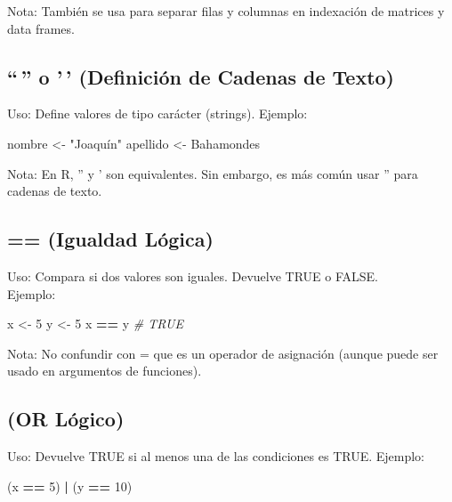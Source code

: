 \documentclass[
]{book}
\newenvironment{Shaded}{\begin{snugshade}}{\end{snugshade}}
\newcommand{\CommentTok}[1]{\textcolor[rgb]{0.56,0.35,0.01}{\textit{#1}}}
\newcommand{\DecValTok}[1]{\textcolor[rgb]{0.00,0.00,0.81}{#1}}
\newcommand{\NormalTok}[1]{#1}
\newcommand{\OtherTok}[1]{\textcolor[rgb]{0.56,0.35,0.01}{#1}}
\newcommand{\SpecialCharTok}[1]{\textcolor[rgb]{0.81,0.36,0.00}{\textbf{#1}}}
\newcommand{\StringTok}[1]{\textcolor[rgb]{0.31,0.60,0.02}{#1}}
\begin{document}
Nota: También se usa para separar filas y columnas en indexación de matrices y data frames.

\subsection{``\,'' o '\,' (Definición de Cadenas de Texto)}\label{texto}

Uso: Define valores de tipo carácter (strings).
Ejemplo:

\begin{Shaded}
\begin{Highlighting}[]
\NormalTok{nombre }\OtherTok{\textless{}{-}} \StringTok{"Joaquín"}
\NormalTok{apellido }\OtherTok{\textless{}{-}} \StringTok{\textquotesingle{}Bahamondes\textquotesingle{}}
\end{Highlighting}
\end{Shaded}

Nota: En R, '' y ' son equivalentes. Sin embargo, es más común usar '' para cadenas de texto.

\subsection{== (Igualdad Lógica)}\label{equivalencia}

Uso: Compara si dos valores son iguales. Devuelve TRUE o FALSE.\\
Ejemplo:

\begin{Shaded}
\begin{Highlighting}[]
\NormalTok{x }\OtherTok{\textless{}{-}} \DecValTok{5}
\NormalTok{y }\OtherTok{\textless{}{-}} \DecValTok{5}
\NormalTok{x }\SpecialCharTok{==}\NormalTok{ y  }\CommentTok{\# TRUE}
\end{Highlighting}
\end{Shaded}

Nota: No confundir con = que es un operador de asignación (aunque puede ser usado en argumentos de funciones).

\subsection{\textbar{} (OR Lógico)}\label{OR}

Uso: Devuelve TRUE si al menos una de las condiciones es TRUE.
Ejemplo:

\begin{Shaded}
\begin{Highlighting}[]
\NormalTok{(x }\SpecialCharTok{==} \DecValTok{5}\NormalTok{) }\SpecialCharTok{|}\NormalTok{ (y }\SpecialCharTok{==} \DecValTok{10}\NormalTok{)}
\end{Highlighting}
\end{Shaded}
\end{document}
